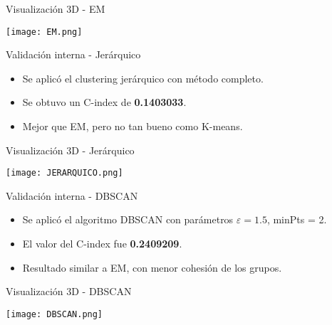 \documentclass[
	11pt, %
]{beamer}
\begin{document}
\begin{frame}{Visualización 3D - EM}
\begin{center}
    \texttt{[image: EM.png]}
\end{center}
\end{frame}

\begin{frame}{Validación interna - Jerárquico}
\begin{itemize}
    \item Se aplicó el clustering jerárquico con método completo.
    \item Se obtuvo un C-index de \textbf{0.1403033}.
    \item Mejor que EM, pero no tan bueno como K-means.
\end{itemize}
\end{frame}

\begin{frame}{Visualización 3D - Jerárquico}
\begin{center}
    \texttt{[image: JERARQUICO.png]}
\end{center}
\end{frame}

\begin{frame}{Validación interna - DBSCAN}
\begin{itemize}
    \item Se aplicó el algoritmo DBSCAN con parámetros $\varepsilon = 1.5$, minPts = 2.
    \item El valor del C-index fue \textbf{0.2409209}.
    \item Resultado similar a EM, con menor cohesión de los grupos.
\end{itemize}
\end{frame}

\begin{frame}{Visualización 3D - DBSCAN}
\begin{center}
    \texttt{[image: DBSCAN.png]}
\end{center}
\end{frame}
\end{document}
